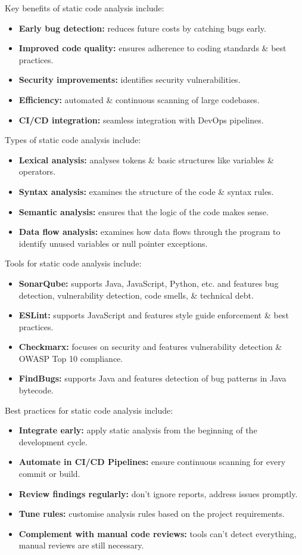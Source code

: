\documentclass[a4paper,11pt]{article}
\begin{document}
Key benefits of static code analysis include:
\begin{itemize}
    \item   \textbf{Early bug detection:} reduces future costs by catching bugs early.
    \item   \textbf{Improved code quality:} ensures adherence to coding standards \& best practices.
    \item   \textbf{Security improvements:} identifies security vulnerabilities.
    \item   \textbf{Efficiency:} automated \& continuous scanning of large codebases.
    \item   \textbf{CI/CD integration:} seamless integration with DevOps pipelines.
\end{itemize}

Types of static code analysis include:
\begin{itemize}
    \item   \textbf{Lexical analysis:} analyses tokens \& basic structures like variables \& operators.
    \item   \textbf{Syntax analysis:} examines the structure of the code \& syntax rules.
    \item   \textbf{Semantic analysis:} ensures that the logic of the code makes sense.
    \item   \textbf{Data flow analysis:} examines how data flows through the program to identify unused variables or null pointer exceptions.
\end{itemize}

Tools for static code analysis include:
\begin{itemize}
    \item   \textbf{SonarQube:} supports Java, JavaScript, Python, etc. and features bug detection, vulnerability detection, code smells, \& technical debt.
    \item   \textbf{ESLint:} supports JavaScript and features style guide enforcement \& best practices.
    \item   \textbf{Checkmarx:} focuses on security and features vulnerability detection \& OWASP Top 10 compliance.
    \item   \textbf{FindBugs:} supports Java and features detection of bug patterns in Java bytecode.
\end{itemize}

Best practices for static code analysis include:
\begin{itemize}
    \item   \textbf{Integrate early:} apply static analysis from the beginning of the development cycle.
    \item   \textbf{Automate in CI/CD Pipelines:} ensure continuous scanning for every commit or build.
    \item   \textbf{Review findings regularly:} don't ignore reports, address issues promptly.
    \item   \textbf{Tune rules:} customise analysis rules based on the project requirements.
    \item   \textbf{Complement with manual code reviews:} tools can't detect everything, manual reviews are still necessary.
\end{itemize}
\end{document}
